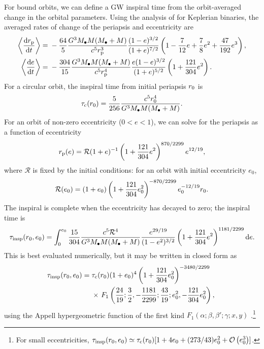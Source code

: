 For bound orbits, we can define a GW inspiral time from the orbit-averaged change in the orbital parameters. Using the analysis of \citet{Peters1964} for Keplerian binaries, the averaged rates of change of the periapsis and eccentricity are
\begin{align}
\left\langle\dfrac{\mathrm{d} {r_\mathrm{p}}}{\mathrm{d} {t}}\right\rangle = {} & -\dfrac{64}{5}\dfrac{G^3M_\bullet M(M_\bullet + M)}{c^5r_\mathrm{p}^3}\dfrac{(1 - e)^{3/2}}{(1 + e)^{7/2}}\left(1 - \dfrac{7}{12}e + \dfrac{7}{8}e^2 + \dfrac{47}{192}e^3\right), \\
\left\langle\dfrac{\mathrm{d} {e}}{\mathrm{d} {t}}\right\rangle = {} & -\dfrac{304}{15}\dfrac{G^3M_\bullet M(M_\bullet + M)}{c^5r_\mathrm{p}^4}\dfrac{e(1 - e)^{3/2}}{(1 + e)^{5/2}}\left(1 + \dfrac{121}{304}e^2\right).
\end{align}
For a circular orbit, the inspiral time from initial periapsis $r_\mathrm{0}$ is
\begin{equation}
\tau_\mathrm{c}(r_\mathrm{0}) = \dfrac{5}{256}\dfrac{c^5r_\mathrm{0}^4}{G^3M_\bullet M(M_\bullet + M)}.
\end{equation}
For an orbit of non-zero eccentricity ($0 < e < 1$), we can solve for the periapsis as a function of eccentricity
\begin{equation}
r_\mathrm{p}(e) = \mathcal{R}(1 + e)^{-1}\left(1 + \dfrac{121}{304}e^2\right)^{870/2299}e^{12/19},
\end{equation}
where $\mathcal{R}$ is fixed by the initial conditions: for an orbit with initial eccentricity $e_0$,
\begin{equation}
\mathcal{R}(e_0) = (1 + e_0)\left(1 + \dfrac{121}{304}e_0^2\right)^{-870/2299}e_0^{-12/19}r_\mathrm{0}.
\end{equation}
The inspiral is complete when the eccentricity has decayed to zero; the inspiral time is \citep{Peters1964}
\begin{equation}
\tau_\mathrm{insp}(r_\mathrm{0},e_0) = \int_{0}^{e_0}{\dfrac{15}{304}\dfrac{c^5\mathcal{R}^4}{G^3M_\bullet M(M_\bullet + M)}\dfrac{e^{29/19}}{(1-e^2)^{3/2}}\left(1 + \dfrac{121}{304}e^2\right)^{1181/2299}}\,\mathrm{d}{e}.
\end{equation}
This is best evaluated numerically, but it may be written in closed form as
\begin{align}
\tau_\mathrm{insp}(r_\mathrm{0},e_0) = {} & \tau_\mathrm{c}(r_\mathrm{0})(1 + e_0)^4\left(1 + \dfrac{121}{304}e_0^2\right)^{-3480/2299} \nonumber \\* 
 {} & \times \left. F_1\left(\dfrac{24}{19};\dfrac{3}{2},-\dfrac{1181}{2299};\dfrac{43}{19};e_0^2,-\dfrac{121}{304}e_0^2\right),\right.
\label{eq:Bound_inspiral}
\end{align}
using the Appell hypergeometric function of the first kind $F_1(\alpha;\beta,\beta';\gamma;x,y)$ \citep[16.15.1]{Olver2010}.\footnote{For small eccentricities, $\tau_\mathrm{insp}(r_\mathrm{0},e_0) \simeq \tau_\mathrm{c}(r_\mathrm{0})[1 + 4e_0 + (273/43)e_0^2 + \mathcal{O}\left({e_0^3}\right)]$.}

